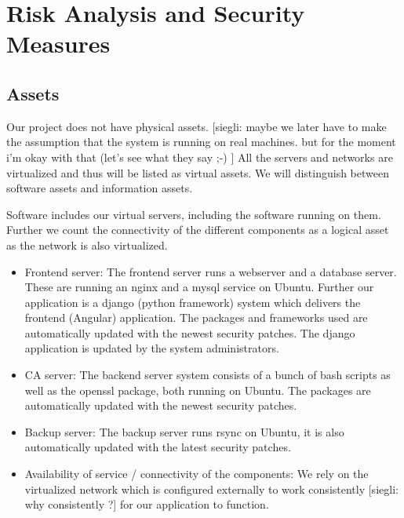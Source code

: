 \documentclass[english]{article}
\begin{document}
%


\section{Risk Analysis and Security Measures}

\subsection{Assets}


Our project does not have physical assets. [siegli:  maybe we later have to make the assumption that the system is running on real machines. but for the moment i'm okay with that (let's see what they say ;-) ]  All the servers and networks are virtualized and thus will be listed as virtual assets. We will distinguish between software assets and information assets.

Software includes our virtual servers, including the software running on them. Further we count the connectivity of the different components as a logical asset as the network is also virtualized.

\begin{itemize}
	\item Frontend server: The frontend server runs a webserver and a database server. These are running an nginx and a mysql service on Ubuntu. Further our application is a django (python framework)  system which delivers the frontend (Angular) application. The packages and frameworks used are automatically updated with the newest security patches. The django application is updated by the system administrators.
	\item CA server: The backend server system consists of a bunch of bash scripts as well as the openssl package, both running on Ubuntu. The packages are automatically updated with the newest security patches.
	\item Backup server: The backup server runs rsync on Ubuntu, it is also automatically updated with the latest security patches.
	\item Availability of service / connectivity of the components: We rely on the virtualized network which is configured externally to work consistently [siegli: why consistently ?] for our application to function. 
\end{itemize}
\end{document}

